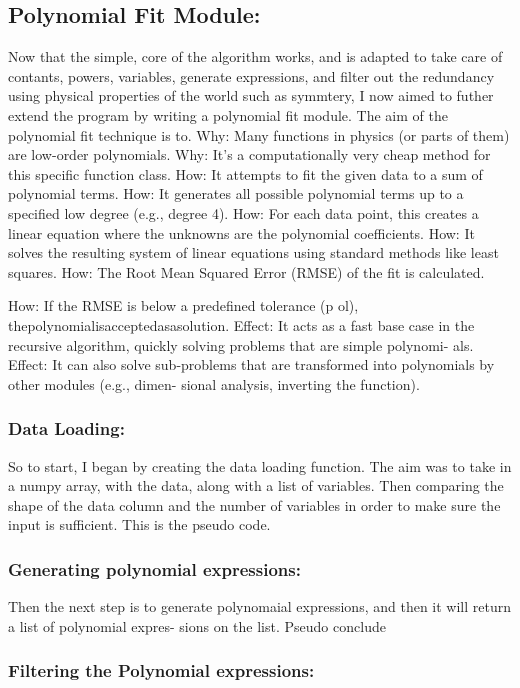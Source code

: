 \documentclass{article}
\begin{document}
\subsection{Polynomial Fit Module: }
Now that the simple, core of the algorithm works, and is adapted to take care of contants, powers, variables,
generate expressions, and filter out the redundancy using physical properties of the world such as symmtery,
I now aimed to futher extend the program by writing a polynomial fit module. The aim of the polynomial fit
technique is to.
Why: Many functions in physics (or parts of them) are low-order polynomials.
Why: It’s a computationally very cheap method for this specific function class.
How: It attempts to fit the given data to a sum of polynomial terms.
How: It generates all possible polynomial terms up to a specified low degree (e.g., degree 4).
How: For each data point, this creates a linear equation where the unknowns are the polynomial coefficients.
How: It solves the resulting system of linear equations using standard methods like least squares.
How: The Root Mean Squared Error (RMSE) of the fit is calculated.

How: If the RMSE is below a predefined tolerance (p ol), thepolynomialisacceptedasasolution.
Effect: It acts as a fast base case in the recursive algorithm, quickly solving problems that are simple polynomi-
als.
Effect: It can also solve sub-problems that are transformed into polynomials by other modules (e.g., dimen-
sional analysis, inverting the function).

\subsubsection{Data Loading:}
So to start, I began by creating the data loading function. The aim was to take in a numpy array, with the data,
along with a list of variables. Then comparing the shape of the data column and the number of variables in order
to make sure the input is sufficient.
This is the pseudo code. 


\subsubsection{Generating polynomial expressions:}

Then the next step is to generate polynomaial expressions, and then it will return a list of polynomial expres-
sions on the list.
Pseudo conclude


\subsubsection{Filtering the Polynomial expressions:}
\end{document}
